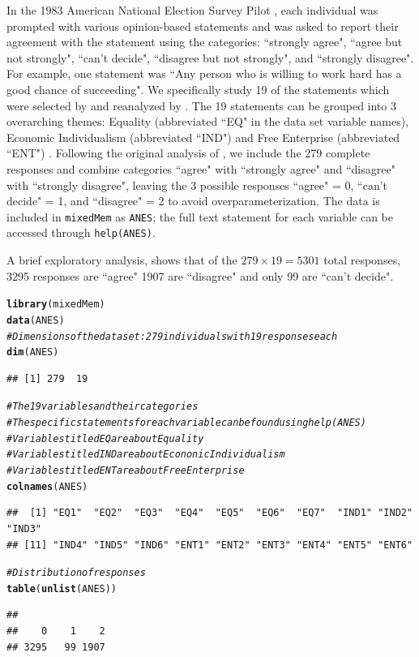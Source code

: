 \documentclass{article}\usepackage[]{graphicx}\usepackage[]{color}
\makeatletter
\newcommand{\hlcom}[1]{\textcolor[rgb]{0.678,0.584,0.686}{\textit{#1}}}%
\newcommand{\hlstd}[1]{\textcolor[rgb]{0.345,0.345,0.345}{#1}}%
\newcommand{\hlkwd}[1]{\textcolor[rgb]{0.737,0.353,0.396}{\textbf{#1}}}%
\newenvironment{kframe}{%
 \def\at@end@of@kframe{}%
 \ifinner\ifhmode%
  \def\at@end@of@kframe{\end{minipage}}%
  \begin{minipage}{\columnwidth}%
 \fi\fi%
 \def\FrameCommand##1{\hskip\@totalleftmargin \hskip-\fboxsep
 \colorbox{shadecolor}{##1}\hskip-\fboxsep
     \hskip-\linewidth \hskip-\@totalleftmargin \hskip\columnwidth}%
 \MakeFramed {\advance\hsize-\width
   \@totalleftmargin\z@ \linewidth\hsize
   \@setminipage}}%
 {\par\unskip\endMakeFramed%
 \at@end@of@kframe}
\newenvironment{knitrout}{}{} %
\renewenvironment{knitrout}{\begin{singlespace}}{\end{singlespace}}
\makeatother
\begin{document}
In the 1983 American National Election Survey Pilot \citep{ANES}, each individual was prompted with various opinion-based statements and was asked to report their agreement with the statement using the categories: ``strongly agree", ``agree but not strongly", ``can't decide", ``disagree but not strongly", and ``strongly disagree". For example, one statement was ``Any person who is willing to work hard has a good chance of succeeding". We specifically study 19 of the statements which were selected by \cite{feldman1988structure} and reanalyzed by \citep{grossManriqueVallier}.  The 19 statements can be grouped into 3 overarching themes: Equality (abbreviated ``EQ" in the data set variable names), Economic Individualism (abbreviated ``IND") and Free Enterprise (abbreviated ``ENT") \citep{feldman1988structure}.  Following the original analysis of \cite{grossManriqueVallier}, we include the 279 complete responses and combine categories ``agree" with ``strongly agree" and ``disagree"  with ``strongly disagree", leaving the 3 possible responses ``agree" = 0, ``can't decide" = 1, and ``disagree" = 2 to avoid overparameterization. The data is included in \texttt{mixedMem} as \texttt{ANES}; the full text statement for each variable can be accessed through \texttt{help(ANES)}. 

A brief exploratory analysis, shows that of the $279 \times 19 = 5301$ total responses, 3295 responses are ``agree" 1907 are ``disagree" and only 99 are ``can't decide".



\begin{knitrout}
\color{fgcolor}\begin{kframe}
\begin{alltt}
\hlkwd{library}\hlstd{(mixedMem)}
\hlkwd{data}\hlstd{(ANES)}
\hlcom{# Dimensions of the data set: 279 individuals with 19 responses each}
\hlkwd{dim}\hlstd{(ANES)}
\end{alltt}
\begin{verbatim}
## [1] 279  19
\end{verbatim}
\begin{alltt}
\hlcom{# The 19 variables and their categories}
\hlcom{# The specific statements for each variable can be found using help(ANES)}
\hlcom{# Variables titled EQ are about Equality}
\hlcom{# Variables titled IND are about Econonic Individualism}
\hlcom{# Variables titled ENT are about Free Enterprise}
\hlkwd{colnames}\hlstd{(ANES)}
\end{alltt}
\begin{verbatim}
##  [1] "EQ1"  "EQ2"  "EQ3"  "EQ4"  "EQ5"  "EQ6"  "EQ7"  "IND1" "IND2" "IND3"
## [11] "IND4" "IND5" "IND6" "ENT1" "ENT2" "ENT3" "ENT4" "ENT5" "ENT6"
\end{verbatim}
\begin{alltt}
\hlcom{# Distribution of responses}
\hlkwd{table}\hlstd{(}\hlkwd{unlist}\hlstd{(ANES))}
\end{alltt}
\begin{verbatim}
## 
##    0    1    2 
## 3295   99 1907
\end{verbatim}
\end{kframe}
\end{knitrout}
\end{document}
